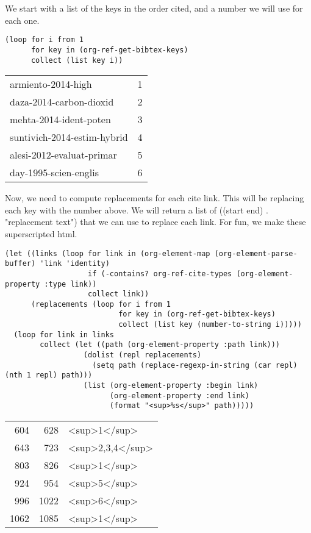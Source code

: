\documentclass[11pt]{article}
\begin{document}
We start with a list of the keys in the order cited, and a number we will use for each one.

\begin{verbatim}
(loop for i from 1
      for key in (org-ref-get-bibtex-keys)
      collect (list key i))
\end{verbatim}

\begin{center}
\begin{tabular}{lr}
armiento-2014-high & 1\\
daza-2014-carbon-dioxid & 2\\
mehta-2014-ident-poten & 3\\
suntivich-2014-estim-hybrid & 4\\
alesi-2012-evaluat-primar & 5\\
day-1995-scien-englis & 6\\
\end{tabular}
\end{center}

Now, we need to compute replacements for each cite link. This will be replacing each key with the number above. We will return a list of ((start end) . "replacement text") that we can use to replace each link. For fun, we make these superscripted html.

\begin{verbatim}
(let ((links (loop for link in (org-element-map (org-element-parse-buffer) 'link 'identity)
                   if (-contains? org-ref-cite-types (org-element-property :type link))
                   collect link))
      (replacements (loop for i from 1
                          for key in (org-ref-get-bibtex-keys)
                          collect (list key (number-to-string i)))))
  (loop for link in links
        collect (let ((path (org-element-property :path link)))
                  (dolist (repl replacements)
                    (setq path (replace-regexp-in-string (car repl) (nth 1 repl) path)))
                  (list (org-element-property :begin link)
                        (org-element-property :end link)
                        (format "<sup>%s</sup>" path)))))
\end{verbatim}

\begin{center}
\begin{tabular}{rrl}
604 & 628 & <sup>1</sup>\\
643 & 723 & <sup>2,3,4</sup>\\
803 & 826 & <sup>1</sup>\\
924 & 954 & <sup>5</sup>\\
996 & 1022 & <sup>6</sup>\\
1062 & 1085 & <sup>1</sup>\\
\end{tabular}
\end{center}
\end{document}
